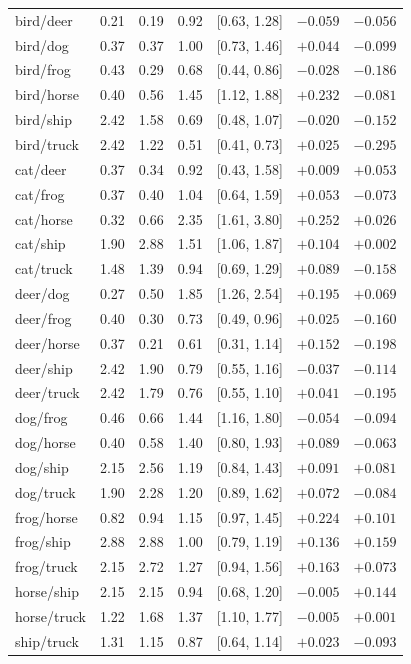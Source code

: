 \begin{table}[h]
\begin{tabular}{lcccccc}
bird/deer & 0.21 & 0.19 & 0.92 & [0.63, 1.28] & $-0.059$ & $-0.056$ \\
bird/dog & 0.37 & 0.37 & 1.00 & [0.73, 1.46] & $+0.044$ & $-0.099$ \\
bird/frog & 0.43 & 0.29 & 0.68 & [0.44, 0.86] & $-0.028$ & $-0.186$ \\
bird/horse & 0.40 & 0.56 & 1.45 & [1.12, 1.88] & $+0.232$ & $-0.081$ \\
bird/ship & 2.42 & 1.58 & 0.69 & [0.48, 1.07] & $-0.020$ & $-0.152$ \\
bird/truck & 2.42 & 1.22 & 0.51 & [0.41, 0.73] & $+0.025$ & $-0.295$ \\
cat/deer & 0.37 & 0.34 & 0.92 & [0.43, 1.58] & $+0.009$ & $+0.053$ \\
cat/frog & 0.37 & 0.40 & 1.04 & [0.64, 1.59] & $+0.053$ & $-0.073$ \\
cat/horse & 0.32 & 0.66 & 2.35 & [1.61, 3.80] & $+0.252$ & $+0.026$ \\
cat/ship & 1.90 & 2.88 & 1.51 & [1.06, 1.87] & $+0.104$ & $+0.002$ \\
cat/truck & 1.48 & 1.39 & 0.94 & [0.69, 1.29] & $+0.089$ & $-0.158$ \\
deer/dog & 0.27 & 0.50 & 1.85 & [1.26, 2.54] & $+0.195$ & $+0.069$ \\
deer/frog & 0.40 & 0.30 & 0.73 & [0.49, 0.96] & $+0.025$ & $-0.160$ \\
deer/horse & 0.37 & 0.21 & 0.61 & [0.31, 1.14] & $+0.152$ & $-0.198$ \\
deer/ship & 2.42 & 1.90 & 0.79 & [0.55, 1.16] & $-0.037$ & $-0.114$ \\
deer/truck & 2.42 & 1.79 & 0.76 & [0.55, 1.10] & $+0.041$ & $-0.195$ \\
dog/frog & 0.46 & 0.66 & 1.44 & [1.16, 1.80] & $-0.054$ & $-0.094$ \\
dog/horse & 0.40 & 0.58 & 1.40 & [0.80, 1.93] & $+0.089$ & $-0.063$ \\
dog/ship & 2.15 & 2.56 & 1.19 & [0.84, 1.43] & $+0.091$ & $+0.081$ \\
dog/truck & 1.90 & 2.28 & 1.20 & [0.89, 1.62] & $+0.072$ & $-0.084$ \\
frog/horse & 0.82 & 0.94 & 1.15 & [0.97, 1.45] & $+0.224$ & $+0.101$ \\
frog/ship & 2.88 & 2.88 & 1.00 & [0.79, 1.19] & $+0.136$ & $+0.159$ \\
frog/truck & 2.15 & 2.72 & 1.27 & [0.94, 1.56] & $+0.163$ & $+0.073$ \\
horse/ship & 2.15 & 2.15 & 0.94 & [0.68, 1.20] & $-0.005$ & $+0.144$ \\
horse/truck & 1.22 & 1.68 & 1.37 & [1.10, 1.77] & $-0.005$ & $+0.001$ \\
ship/truck & 1.31 & 1.15 & 0.87 & [0.64, 1.14] & $+0.023$ & $-0.093$ \\
\bottomrule
\end{tabular}
\end{table}
